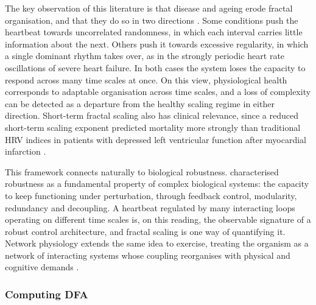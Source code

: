 The key observation of this literature is that disease and ageing erode fractal organisation, and that they do so in two directions \citep{lipsitz1992,goldberger2002}. Some conditions push the heartbeat towards uncorrelated randomness, in which each interval carries little information about the next. Others push it towards excessive regularity, in which a single dominant rhythm takes over, as in the strongly periodic heart rate oscillations of severe heart failure. In both cases the system loses the capacity to respond across many time scales at once. On this view, physiological health corresponds to adaptable organisation across time scales, and a loss of complexity can be detected as a departure from the healthy scaling regime in either direction. Short-term fractal scaling also has clinical relevance, since a reduced short-term scaling exponent predicted mortality more strongly than traditional HRV indices in patients with depressed left ventricular function after myocardial infarction \citep{huikuri2000}.

This framework connects naturally to biological robustness. \citet{kitano2004} characterised robustness as a fundamental property of complex biological systems: the capacity to keep functioning under perturbation, through feedback control, modularity, redundancy and decoupling. A heartbeat regulated by many interacting loops operating on different time scales is, on this reading, the observable signature of a robust control architecture, and fractal scaling is one way of quantifying it. Network physiology extends the same idea to exercise, treating the organism as a network of interacting systems whose coupling reorganises with physical and cognitive demands \citep{balague2020}.

\subsubsection{Computing DFA}

